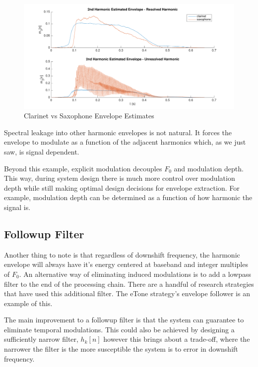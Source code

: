 \documentclass [11pt, proquest,oneside] {ganter_thesis}[2015/03/03]
\begin{document}
\begin{figure}[!ht]
  \centering
    \includegraphics[width=1\textwidth]{matlab/clarinetVSsax_T}   
    \caption{Clarinet vs Saxophone Envelope Estimates}\label{fig:clarinetVSsax_T}
\end{figure}

Spectral leakage into other harmonic envelopes is not natural.  It forces the envelope to modulate as a function of the adjacent harmonics which, as we just saw, is signal dependent.

Beyond this example, explicit modulation decouples $F_0$ and modulation depth.  This way, during system design there is much more control over modulation depth while still making optimal design decisions for envelope extraction.  For example, modulation depth can be determined as a function of how harmonic the signal is.

\subsection{Followup Filter}

Another thing to note is that regardless of downshift frequency, the harmonic envelope will always have it's energy centered at baseband and integer multiples of $F_0$.  An alternative way of eliminating induced modulations is to add a lowpass filter to the end of the processing chain.  There are a handful of research strategies that have used this additional filter.  The eTone strategy's \cite{vandali2011development} envelope follower is an example of this.

The main improvement to a followup filter is that the system can guarantee to eliminate temporal modulations.  This could also be achieved by designing a sufficiently narrow filter, $h_k[n]$ however this brings about a trade-off, where the narrower the filter is the more susceptible the system is to error in downshift frequency.
\end{document}
